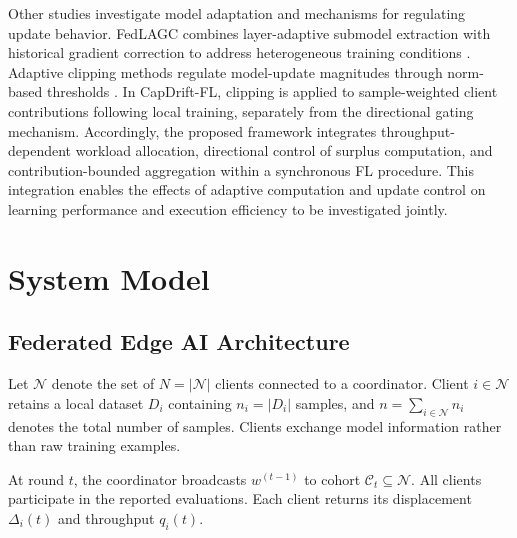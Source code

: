 \documentclass[conference]{IEEEtran}
\begin{document}
Other studies investigate model adaptation and mechanisms for regulating update behavior. FedLAGC combines layer-adaptive submodel extraction with historical gradient correction to address heterogeneous training conditions \cite{hu2026fedlagc}. Adaptive clipping methods regulate model-update magnitudes through norm-based thresholds \cite{andrew2021clipping}. In CapDrift-FL, clipping is applied to sample-weighted client contributions following local training, separately from the directional gating mechanism. Accordingly, the proposed framework integrates throughput-dependent workload allocation, directional control of surplus computation, and contribution-bounded aggregation within a synchronous FL procedure. This integration enables the effects of adaptive computation and update control on learning performance and execution efficiency to be investigated jointly.


\section{System Model}
\label{sec:model}
\subsection{Federated Edge AI Architecture}\label{subsec:architecture}
Let $\mathcal{N}$ denote the set of $N=|\mathcal{N}|$ clients connected to a coordinator. Client $i\in\mathcal{N}$ retains a local dataset $D_i$ containing $n_i=|D_i|$ samples, and $n=\sum_{i\in\mathcal{N}}n_i$ denotes the total number of samples. Clients exchange model information rather than raw training examples. 

At round $t$, the coordinator broadcasts $w^{(t-1)}$ to cohort $\mathcal{C}_t\subseteq\mathcal{N}$. All clients participate in the reported evaluations. Each client returns its displacement $\Delta_i(t)$ and throughput $q_i(t)$.
\end{document}
